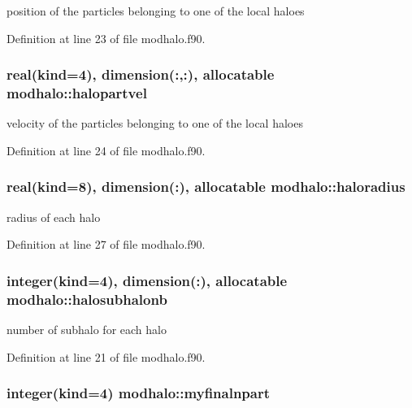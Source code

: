 position of the particles belonging to one of the local haloes 



Definition at line 23 of file modhalo.\-f90.

\hypertarget{classmodhalo_a9d88ee4555aab3eb3cc4626800de250b}{
\subsubsection[{halopartvel}]{\setlength{\rightskip}{0pt plus 5cm}real(kind=4), dimension(\-:,\-:), allocatable modhalo\-::halopartvel}}\label{classmodhalo_a9d88ee4555aab3eb3cc4626800de250b}


velocity of the particles belonging to one of the local haloes 



Definition at line 24 of file modhalo.\-f90.

\hypertarget{classmodhalo_ac245616b2bd1db72ab7891e811f668de}{
\subsubsection[{haloradius}]{\setlength{\rightskip}{0pt plus 5cm}real(kind=8), dimension(\-:), allocatable modhalo\-::haloradius}}\label{classmodhalo_ac245616b2bd1db72ab7891e811f668de}


radius of each halo 



Definition at line 27 of file modhalo.\-f90.

\hypertarget{classmodhalo_a5047e50f3939eaf91496eb430ea12952}{
\subsubsection[{halosubhalonb}]{\setlength{\rightskip}{0pt plus 5cm}integer(kind=4), dimension(\-:), allocatable modhalo\-::halosubhalonb}}\label{classmodhalo_a5047e50f3939eaf91496eb430ea12952}


number of subhalo for each halo 



Definition at line 21 of file modhalo.\-f90.

\hypertarget{classmodhalo_a52f1f25dcc26f652f137e54813e02309}{
\subsubsection[{myfinalnpart}]{\setlength{\rightskip}{0pt plus 5cm}integer(kind=4) modhalo\-::myfinalnpart}}\label{classmodhalo_a52f1f25dcc26f652f137e54813e02309}


